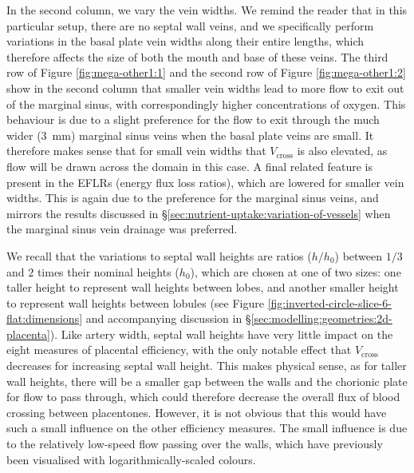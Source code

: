             In the second column, we vary the vein widths. We remind the reader that in this particular setup, there are no septal wall veins, and we specifically perform variations in the basal plate vein widths along their entire lengths, which therefore affects the size of both the mouth and base of these veins. The third row of Figure \ref{fig:mega-other1:1} and the second row of Figure \ref{fig:mega-other1:2} show in the second column that smaller vein widths lead to more flow to exit out of the marginal sinus, with correspondingly higher concentrations of oxygen. This behaviour is due to a slight preference for the flow to exit through the much wider (\qty{3}{\milli\metre}) marginal sinus veins when the basal plate veins are small. It therefore makes sense that for small vein widths that $V_\text{cross}$ is also elevated, as flow will be drawn across the domain in this case. A final related feature is present in the EFLRs (energy flux loss ratios), which are lowered for smaller vein widths. This is again due to the preference for the marginal sinus veins, and mirrors the results discussed in \S\ref{sec:nutrient-uptake:variation-of-vessels} when the marginal sinus vein drainage was preferred.

            We recall that the variations to septal wall heights are ratios ($h/h_0$) between $1/3$ and $2$ times their nominal heights ($h_0$), which are chosen at one of two sizes: one taller height to represent wall heights between lobes, and another smaller height to represent wall heights between lobules (see Figure \ref{fig:inverted-circle-slice-6-flat:dimensions} and accompanying discussion in \S\ref{sec:modelling:geometries:2d-placenta}). Like artery width, septal wall heights have very little impact on the eight measures of placental efficiency, with the only notable effect that $V_\text{cross}$ decreases for increasing septal wall height. This makes physical sense, as for taller wall heights, there will be a smaller gap between the walls and the chorionic plate for flow to pass through, which could therefore decrease the overall flux of blood crossing between placentones. However, it is not obvious that this would have such a small influence on the other efficiency measures. The small influence is due to the relatively low-speed flow passing over the walls, which have previously been visualised with logarithmically-scaled colours.

